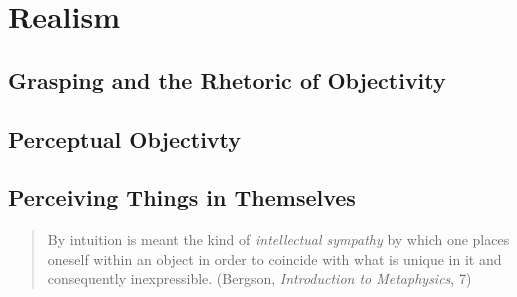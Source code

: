 \chapter{Realism} %
\label{cha:realism}

\section{Grasping and the Rhetoric of Objectivity} %
\label{sec:grasping_and_the_rhetoric_of_objectivity}


\section{Perceptual Objectivty} %
\label{sec:perceptual_objectivty}


\section{Perceiving Things in Themselves} %
\label{sec:perceiving_things_in_themselves}


\begin{quote}
	By intuition is meant the kind of \emph{intellectual sympathy} by which one places oneself within an object in order to coincide with what is unique in it and consequently inexpressible. (Bergson, \emph{Introduction to Metaphysics}, 7)
\end{quote}

